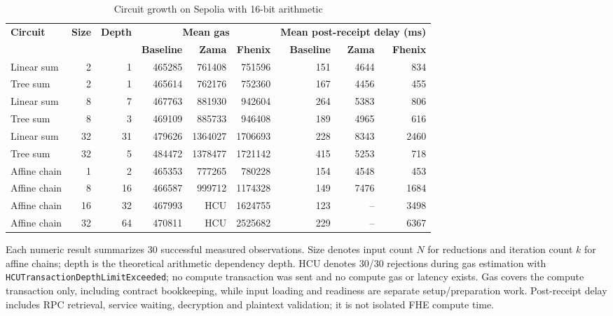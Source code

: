 \begin{table}[!t]
\caption{Circuit growth on Sepolia with 16-bit arithmetic}
\label{tab:circuit-growth}
\centering\scriptsize
\setlength{\tabcolsep}{4pt}
\begin{tabular}{|l|r|r|rrr|rrr|}\hline
\textbf{Circuit} & \textbf{Size} & \textbf{Depth} & \multicolumn{3}{c|}{\textbf{Mean gas}} & \multicolumn{3}{c|}{\textbf{Mean post-receipt delay (ms)}} \\
\cline{4-9}
 & & & \textbf{Baseline} & \textbf{Zama} & \textbf{Fhenix} & \textbf{Baseline} & \textbf{Zama} & \textbf{Fhenix} \\
\hline
Linear sum & 2 & 1 & 465285 & 761408 & 751596 & 151 & 4644 & 834 \\
Tree sum & 2 & 1 & 465614 & 762176 & 752360 & 167 & 4456 & 455 \\
Linear sum & 8 & 7 & 467763 & 881930 & 942604 & 264 & 5383 & 806 \\
Tree sum & 8 & 3 & 469109 & 885733 & 946408 & 189 & 4965 & 616 \\
Linear sum & 32 & 31 & 479626 & 1364027 & 1706693 & 228 & 8343 & 2460 \\
Tree sum & 32 & 5 & 484472 & 1378477 & 1721142 & 415 & 5253 & 718 \\
Affine chain & 1 & 2 & 465353 & 777265 & 780228 & 154 & 4548 & 453 \\
Affine chain & 8 & 16 & 466587 & 999712 & 1174328 & 149 & 7476 & 1684 \\
Affine chain & 16 & 32 & 467993 & HCU & 1624755 & 123 & -- & 3498 \\
Affine chain & 32 & 64 & 470811 & HCU & 2525682 & 229 & -- & 6367 \\
\hline\end{tabular}
\par\smallskip
\begin{minipage}{\textwidth}\scriptsize Each numeric result summarizes 30 successful measured observations. Size denotes input count $N$ for reductions and iteration count $k$ for affine chains; depth is the theoretical arithmetic dependency depth. HCU denotes 30/30 rejections during gas estimation with \texttt{HCUTransactionDepthLimitExceeded}; no compute transaction was sent and no compute gas or latency exists. Gas covers the compute transaction only, including contract bookkeeping, while input loading and readiness are separate setup/preparation work. Post-receipt delay includes RPC retrieval, service waiting, decryption and plaintext validation; it is not isolated FHE compute time.\end{minipage}
\end{table}

